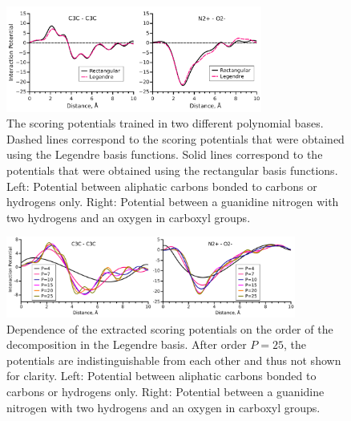 \begin{figure}[H]
\begin{center}
\includegraphics[width=0.75\textwidth]{Scoring/Fig/2functions}
\caption[The scoring potentials trained in two different polynomial bases]{The scoring potentials trained in two different polynomial bases. Dashed lines correspond to the scoring potentials that were obtained using the Legendre basis functions. 
Solid lines correspond to the potentials that were obtained using the rectangular basis functions. 
Left: Potential between aliphatic carbons bonded to carbons or hydrogens only.
Right: Potential between a guanidine nitrogen with two hydrogens and an oxygen in carboxyl groups.
}
\label{fig:potentials} 
\end{center}
\end{figure}

\begin{figure}[H]
\begin{center}
\includegraphics[width=0.85\textwidth]{Scoring/Fig/adaptivity_01}
\caption[Dependence of the extracted scoring potentials on the order of the decomposition in the Legendre basis]{
Dependence of the extracted scoring potentials on the order of the decomposition in the Legendre basis. After order $P=25$, the potentials are indistinguishable from each other and thus not shown for clarity.
%
Left: Potential between aliphatic carbons bonded to carbons or hydrogens only.
Right: Potential between a guanidine nitrogen with two hydrogens and an oxygen in carboxyl groups.
}
\label{fig:potentialsDec} 
\end{center}
\end{figure}


